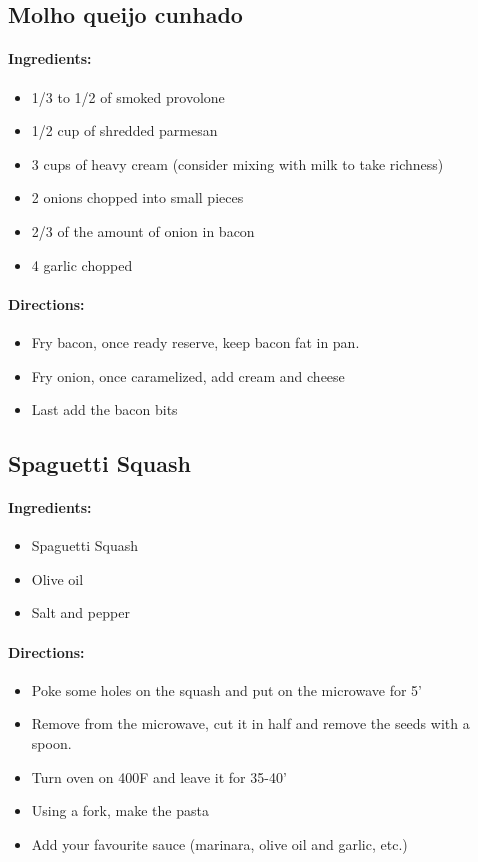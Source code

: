 \documentclass{article}
\begin{document}
\subsection{Molho queijo cunhado}

\paragraph{Ingredients:}
\begin{itemize}
    \item 1/3 to 1/2 of smoked provolone
    \item 1/2 cup of shredded parmesan
    \item 3 cups of heavy cream (consider mixing with milk to take richness)
    \item 2 onions chopped into small pieces
    \item 2/3 of the amount of onion in bacon
    \item 4 garlic chopped
\end{itemize}

\paragraph{Directions:}
\begin{itemize}
    \item Fry bacon, once ready reserve, keep bacon fat in pan.
    \item Fry onion, once caramelized, add cream and cheese
    \item Last add the bacon bits
\end{itemize}

\subsection{Spaguetti Squash}

\paragraph{Ingredients:}
\begin{itemize}
    \item Spaguetti Squash
    \item Olive oil
    \item Salt and pepper
\end{itemize}

\paragraph{Directions:}
\begin{itemize}
    \item Poke some holes on the squash and put on the microwave for 5'
    \item Remove from the microwave, cut it in half and remove the seeds with a spoon.
    \item Turn oven on 400F and leave it for 35-40'
    \item Using a fork, make the pasta
    \item Add your favourite sauce (marinara, olive oil and garlic, etc.)
\end{itemize}
\end{document}
